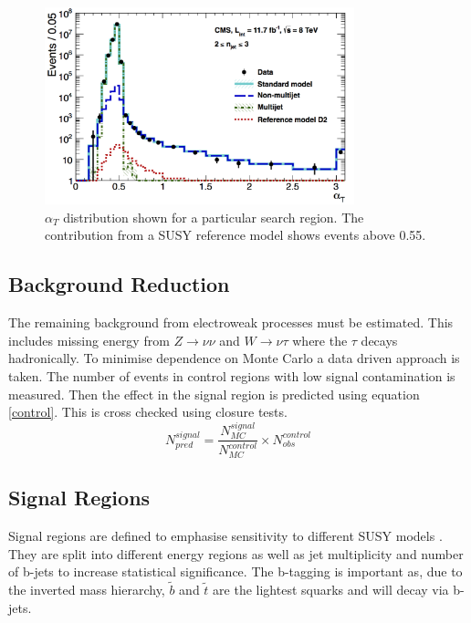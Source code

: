\begin{figure}
\centering
    \includegraphics[width=0.8\textwidth]{Figures/sample_aT.jpg}
  \caption{$\alpha_T$ distribution shown for a particular search region. The contribution from a SUSY reference model shows events above 0.55.}
  \label{alphdis}
\end{figure}

\subsection{Background Reduction}
The remaining background from electroweak processes must be estimated. This includes missing energy from $Z\rightarrow\nu\nu$ and $W\rightarrow\nu\tau$ where the $\tau$ decays hadronically. To minimise dependence on Monte Carlo a data driven approach is taken. The number of events in control regions with low signal contamination is measured. Then the effect in the signal region is predicted using equation \ref{control}. This is cross checked using closure tests.
\begin{equation}
\label{control}
N_{pred}^{signal}=\frac{N_{MC}^{signal}}{N_{MC}^{control}}\times N^{control}_{obs}
\end{equation} 
\subsection{Signal Regions}
Signal regions are defined to emphasise sensitivity to different SUSY models \cite{CMSAT8}. They are split into different energy regions as well as jet multiplicity and number of b-jets to increase statistical significance. The b-tagging is important as, due to the inverted mass hierarchy, $\tilde{b}$ and $\tilde{t}$ are the lightest squarks and will decay via b-jets.

